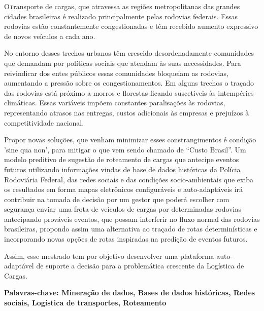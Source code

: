 \vspace*{12pt}

\lettrine {O} transporte de cargas, que atravessa as regiões metropolitanas das grandes cidades brasileiras é realizado principalmente pelas rodovias federais. 
Essas rodovias estão constantemente congestionadas e têm recebido aumento expressivo de novos veículos a cada ano. 

No entorno desses trechos urbanos têm crescido desordenadamente comunidades que demandam por políticas sociais que atendam às 
suas necessidades. Para reivindicar dos entes públicos essas comunidades bloqueiam as rodovias, aumentando a pressão sobre os congestionamentos.
Em alguns trechos o traçado das rodovias está próximo a morros e florestas ficando suscetíveis às intempéries climáticas.
Essas variáveis impõem constantes paralisações às rodovias, representando atrasos nas entregas, custos adicionais às empresas e prejuízos à competitividade nacional. 

Propor novas soluções, que venham minimizar esses constrangimentos é condição 'sine qua non', para mitigar o que vem sendo chamado de ``Custo Brasil''. 
Um modelo preditivo de sugestão de roteamento de cargas que antecipe eventos futuros utilizando informações vindas de base de dados históricas da Polícia Rodoviária Federal, 
das redes sociais e das condições socio-ambientais que exiba os resultados em forma mapas eletrônicos configuráveis e 
auto-adaptáveis irá contribuir na tomada de decisão por um gestor que poderá escolher com segurança enviar uma 
frota de veículos de cargas por determinadas rodovias antecipando prováveis eventos, que possam interferir no fluxo normal das 
rodovias brasileiras, propondo assim uma alternativa ao traçado de rotas determinísticas e incorporando novas 
opções de rotas inspiradas na predição de eventos futuros.

Assim, esse mestrado tem por objetivo desenvolver uma plataforma auto-adaptável de suporte a decisão para a problemática 
crescente da Logística de Cargas.

\par
\vspace{2em}
\noindent\textbf{Palavras-chave: Mineração de dados, Bases de dados históricas, Redes sociais, Logística de transportes, Roteamento}
